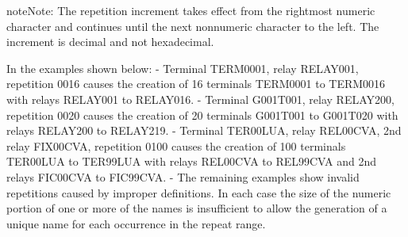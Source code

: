 \documentclass[letterpaper,10pt,english]{sphinxmanual}
\begin{document}
\begin{sphinxadmonition}{note}{Note:}
The repetition increment takes effect from the rightmost numeric character and continues until the next nonnumeric character to the left. The increment is decimal and not hexadecimal.
\end{sphinxadmonition}


In the examples shown below:
- Terminal TERM0001, relay RELAY001, repetition 0016 causes the creation of 16 terminals TERM0001 to TERM0016 with relays RELAY001 to RELAY016.
- Terminal G001T001, relay RELAY200, repetition 0020 causes the creation of 20 terminals G001T001 to G001T020 with relays RELAY200 to RELAY219.
- Terminal TER00LUA, relay REL00CVA, 2nd relay FIX00CVA, repetition 0100 causes the creation of 100 terminals TER00LUA to TER99LUA with relays REL00CVA to REL99CVA and 2nd relays FIC00CVA to FIC99CVA.
- The remaining examples show invalid repetitions caused by improper definitions. In each case the size of the numeric portion of one or more of the names is insufficient to allow the generation of a unique name for each occurrence in the repeat range.
\end{document}
